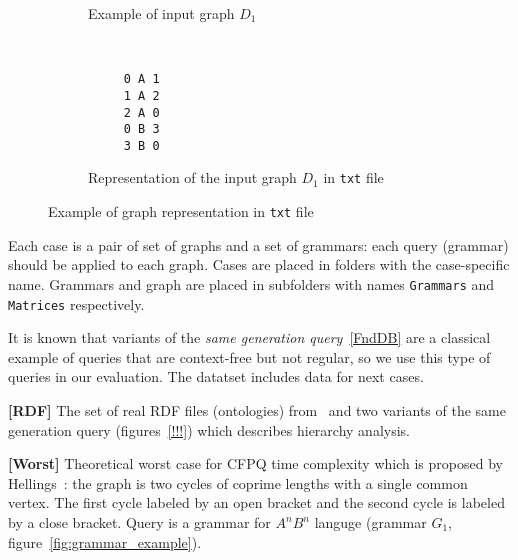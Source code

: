 \begin{figure}[h]
    \centering
    \begin{subfigure}[b]{0.24\textwidth}
        \centering

        \caption{Example of input graph $D_1$}
    \end{subfigure}%
    ~
    \begin{subfigure}[b]{0.24\textwidth}
        \centering
         \begin{verbatim}
     0 A 1
     1 A 2
     2 A 0
     0 B 3
     3 B 0
 \end{verbatim}

        \caption{Representation of the input graph $D_1$ in \texttt{txt} file}
    \end{subfigure}
    \caption{Example of graph representation in \texttt{txt} file}
    \label{fig:graph_example}
\end{figure}

Each case is a pair of set of graphs and a set of grammars: each query (grammar) should be applied to each graph.
Cases are placed in folders with the case-specific name.
Grammars and graph are placed in subfolders with names \verb|Grammars| and \verb|Matrices| respectively.


It is known that variants of the \textit{same generation query}~\ref{FndDB} are a classical example of queries that are context-free but not regular, so we use this type of queries in our evaluation.
The datatset includes data for next cases.

\textbf{[RDF]} The set of real RDF files (ontologies) from~\cite{RDF} and two variants of the same generation query (figures~\ref{!!!}) which describes hierarchy analysis.

\textbf{[Worst]} Theoretical worst case for CFPQ time complexity which is proposed by Hellings~\cite{hellingsPathQuerying}: the graph is two cycles of coprime lengths with a single common vertex.
The first cycle labeled by an open bracket and the second cycle is labeled by a close bracket.
Query is a grammar for $A^nB^n$ languge (grammar $G_1$, figure~\ref{fig:grammar_example}).

